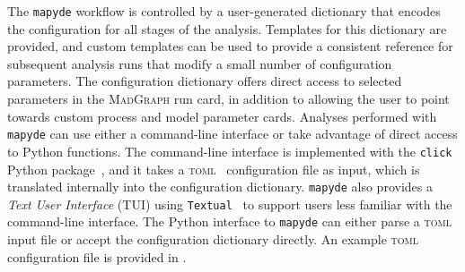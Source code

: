 \documentclass{article}
\newcommand{\mapyde}{\texttt{mapyde}}
\newcommand{\madgraph}{\textsc{MadGraph}}
\newcommand{\toml}{\textsc{toml}}
\begin{document}
The \mapyde{} workflow is controlled by a user-generated dictionary that encodes the configuration for all stages of the analysis.  Templates for this dictionary are provided, and custom templates can be used to provide a consistent reference for subsequent analysis runs that modify a small number of configuration parameters.  The configuration dictionary offers direct access to selected parameters in the \madgraph{} run card, in addition to allowing the user to point towards custom process and model parameter cards.  Analyses performed with \mapyde{} can use either a command-line interface or take advantage of direct access to Python functions.  The command-line interface is implemented with the \texttt{click} Python package~\cite{click}, and it takes a \toml{}~\cite{toml} configuration file as input, which is translated internally into the configuration dictionary.  \mapyde{} also provides a \textsl{Text User Interface} (TUI) using \texttt{Textual}~\cite{textual} to support users less familiar with the command-line interface.  The Python interface to \mapyde{} can either parse a \toml{} input file or accept the configuration dictionary directly.  An example \toml{} configuration file is provided in .
\end{document}
